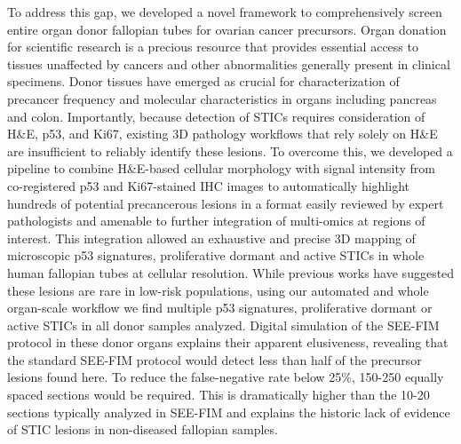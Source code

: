 \begin{refsection}
    To address this gap, we developed a novel framework to comprehensively screen entire organ donor fallopian tubes for ovarian cancer precursors. Organ donation for scientific research is a precious resource that provides essential access to tissues unaffected by cancers and other abnormalities generally present in clinical specimens. Donor tissues have emerged as crucial for characterization of precancer frequency and molecular characteristics in organs including pancreas and colon\cite{Carpenter2023Analysis,Penz2023Colorectal}. Importantly, because detection of STICs requires consideration of H\&E, p53, and Ki67, existing 3D pathology workflows that rely solely on H\&E are insufficient to reliably identify these lesions. To overcome this, we developed a pipeline to combine H\&E-based cellular morphology with signal intensity from co-registered p53 and Ki67-stained IHC images to automatically highlight hundreds of potential precancerous lesions in a format easily reviewed by expert pathologists and amenable to further integration of multi-omics at regions of interest. This integration allowed an exhaustive and precise 3D mapping of microscopic p53 signatures, proliferative dormant and active STICs in whole human fallopian tubes at cellular resolution.
    While previous works have suggested these lesions are rare in low-risk populations\cite{Meserve2017Frequency,Rabban2014Early,Samimi2018Population}, using our automated and whole organ-scale workflow we find multiple p53 signatures, proliferative dormant or active STICs in all donor samples analyzed. Digital simulation of the SEE-FIM protocol in these donor organs explains their apparent elusiveness, revealing that the standard SEE-FIM protocol would detect less than half of the precursor lesions found here. To reduce the false-negative rate below 25\%, 150-250 equally spaced sections would be required. This is dramatically higher than the 10-20 sections typically analyzed in SEE-FIM and explains the historic lack of evidence of STIC lesions in non-diseased fallopian samples.

\end{refsection}
